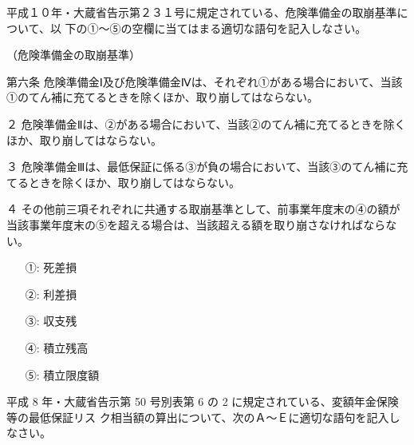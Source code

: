 \documentclass[report,gutter=10mm,fore-edge=10mm,uplatex,dvipdfmx]{jlreq}
\begin{document}

平成１０年・大蔵省告示第２３１号に規定されている、危険準備金の取崩基準について、以
下の①～⑤の空欄に当てはまる適切な語句を記入しなさい。

（危険準備金の取崩基準）

第六条 危険準備金Ⅰ及び危険準備金Ⅳは、それぞれ①がある場合において、当該
①のてん補に充てるときを除くほか、取り崩してはならない。

２ 危険準備金Ⅱは、②がある場合において、当該②のてん補に充てるときを除くほか、取り崩してはならない。

３ 危険準備金Ⅲは、最低保証に係る③が負の場合において、当該③のてん補に充てるときを除くほか、取り崩してはならない。

４ その他前三項それぞれに共通する取崩基準として、前事業年度末の④の額が当該事業年度末の⑤を超える場合は、当該超える額を取り崩さなければならない。

\answer{}
\begin{itemize}
\item[ ①: ] 死差損
\item[ ②: ] 利差損
\item[ ③: ] 収支残
\item[ ④: ] 積立残高
\item[ ⑤: ] 積立限度額
\end{itemize}

平成 8 年・大蔵省告示第 50 号別表第 6 の 2 に規定されている、変額年金保険等の最低保証リス
ク相当額の算出について、次のＡ～Ｅに適切な語句を記入しなさい。
\end{document}
